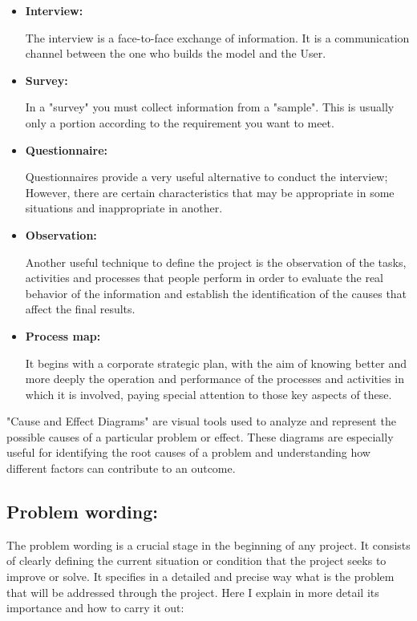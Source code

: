\documentclass{article}
\begin{document}
\begin{itemize}
	\item
	      \textbf{Interview:}
	      \par The interview is a face-to-face exchange of information. It is a
	      communication channel between the one who builds the model and the User.
	\item

	      \textbf{Survey:}
	      \par In a "survey" you must collect information from a "sample". This is
	      usually only a portion according to the requirement you want to meet.
	\item

	      \textbf{Questionnaire:}
	      \par Questionnaires provide a very useful alternative to conduct the
	      interview; However, there are certain characteristics that may be
	      appropriate in some situations and inappropriate in another.

	\item
	      \textbf{Observation:}
	      \par Another useful technique to define the project is the observation
	      of the tasks, activities and processes that people perform in order to
	      evaluate the real behavior of the information and establish the
	      identification of the causes that affect the final results.

	\item
	      \textbf{Process map:}
	      \par It begins with a corporate strategic plan, with the aim of knowing
	      better and more deeply the operation and performance of the processes
	      and activities in which it is involved, paying special attention to
	      those key aspects of these.
\end{itemize}

\par "Cause and Effect Diagrams" are visual tools used to analyze and represent
the possible causes of a particular problem or effect. These diagrams are
especially useful for identifying the root causes of a problem and understanding
how different factors can contribute to an outcome.

\subsection{Problem wording:}
\par The problem wording is a crucial stage in the beginning of any project. It
consists of clearly defining the current situation or condition that the
project seeks to improve or solve. It specifies in a detailed and precise way
what is the problem that will be addressed through the project. Here I explain
in more detail its importance and how to carry it out:
\end{document}
